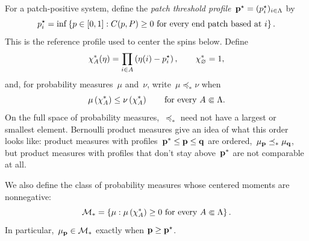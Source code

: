 For a patch-positive system, define the \emph{patch threshold
profile}~$\mathbf{p}^\star=(p_i^\star)_{i\in\Lambda}$ by
\begin{equation*}
p_i^\star
=
\inf\left\{
p\in[0,1]:
C(p,P)\geq0
\text{ for every end patch based at }i
\right\}.
\end{equation*}
This is the reference profile used to center the spins below. Define
\begin{equation*}
\chi_A^*(\eta)
=
\prod_{i\in A}\left(\eta(i)-p_i^\star\right),
\qquad
\chi_\varnothing^*=1,
\end{equation*}
and, for probability measures~$\mu$ and~$\nu$, write~$\mu\preceq_*\nu$ when
\begin{equation*}
\mu\left(\chi_A^*\right)\leq\nu\left(\chi_A^*\right)
\qquad
\text{for every }A\Subset\Lambda.
\end{equation*}
 On the full space of probability measures,~$\preceq_*$ need not have a largest
or smallest element. Bernoulli product measures give an idea of what this order looks like: product measures with profiles~$\mathbf{p}^*\leq \mathbf{p}\leq \mathbf{q}$ are ordered,~$\mu_{\mathbf{p}}\preceq_* \mu_{\mathbf{q}}$, but product measures with profiles that don't stay above~$\mathbf{p}^*$ are not comparable at all. 

We also define the class of probability measures whose
centered moments are nonnegative:
\begin{equation}
\label{eq:m-star-definition}
\mathcal M_*
=
\left\{
\mu:\mu\left(\chi_A^*\right)\geq0
\text{ for every }A\Subset\Lambda
\right\}.
\end{equation}
In particular,~$\mu_{\mathbf{p}}\in\mathcal M_*$ exactly when
$\mathbf{p}\geq\mathbf{p}^\star$.

